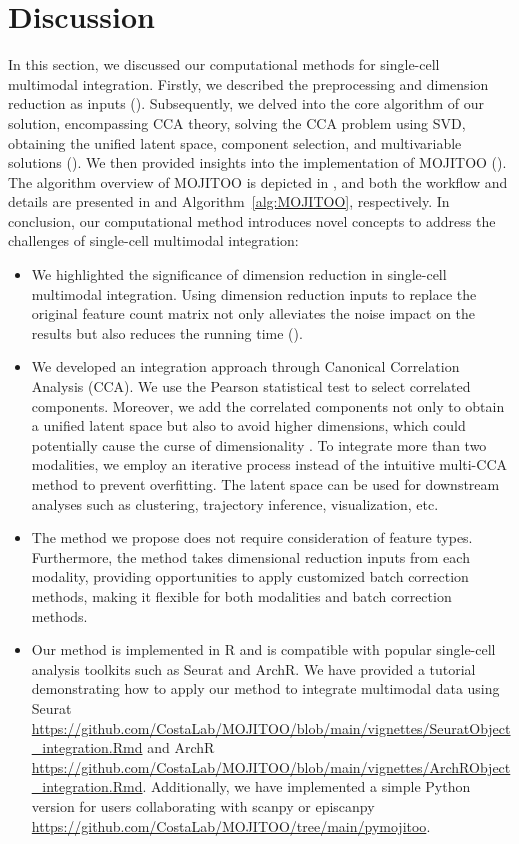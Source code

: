\section{Discussion}
In this section, we discussed our computational methods for single-cell multimodal integration. Firstly, we described the preprocessing and dimension reduction as inputs (). Subsequently, we delved into the core algorithm of our solution, encompassing CCA theory, solving the CCA problem using SVD, obtaining the unified latent space, component selection, and multivariable solutions (). We then provided insights into the implementation of MOJITOO (). The algorithm overview of MOJITOO is depicted in , and both the workflow and details are presented in  and Algorithm~\ref{alg:MOJITOO}, respectively. In conclusion, our computational method introduces novel concepts to address the challenges of single-cell multimodal integration:
\begin{itemize}

    \item We highlighted the significance of dimension reduction in single-cell multimodal integration. Using dimension reduction inputs to replace the original feature count matrix not only alleviates the noise impact on the results but also reduces the running time ().

    \item We developed an integration approach through Canonical Correlation Analysis (CCA). We use the Pearson statistical test to select correlated components. Moreover, we add the correlated components not only to obtain a unified latent space but also to avoid higher dimensions, which could potentially cause the curse of dimensionality \citep{Dreyfus2003}. To integrate more than two modalities, we employ an iterative process instead of the intuitive multi-CCA method to prevent overfitting. The latent space can be used for downstream analyses such as clustering, trajectory inference, visualization, etc.


    \item The method we propose does not require consideration of feature types. Furthermore, the method takes dimensional reduction inputs from each modality, providing opportunities to apply customized batch correction methods, making it flexible for both modalities and batch correction methods.

    \item Our method is implemented in R and is compatible with popular single-cell analysis toolkits such as Seurat and ArchR. We have provided a tutorial demonstrating how to apply our method to integrate multimodal data using Seurat \url{https://github.com/CostaLab/MOJITOO/blob/main/vignettes/SeuratObject_integration.Rmd} and ArchR \url{https://github.com/CostaLab/MOJITOO/blob/main/vignettes/ArchRObject_integration.Rmd}. Additionally, we have implemented a simple Python version for users collaborating with scanpy or episcanpy \url{https://github.com/CostaLab/MOJITOO/tree/main/pymojitoo}.
\end{itemize}

